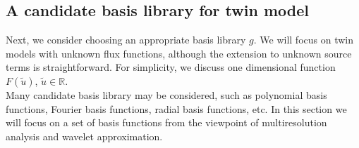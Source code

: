 \documentclass[a4paper,onecolumn]{article}
\theoremstyle{remark}
\begin{document}
\subsection{A candidate basis library for twin model}
\label{basis selection}
\noindent Next, we consider choosing an appropriate basis library $g$.
We will focus on twin models with unknown flux functions, although
the extension to unknown source terms is straightforward.
For simplicity, we discuss one dimensional function $F(\tilde{u})$, $\tilde{u}\in \mathbb{R}$.
\\

\noindent Many candidate basis library may be considered, such as polynomial basis functions,
Fourier basis functions, radial basis functions, etc.
In this section we will focus on a set of basis functions
from the viewpoint of multiresolution analysis and wavelet approximation.
\\
\end{document}
